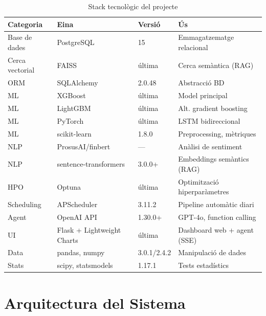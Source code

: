 \documentclass[12pt, a4paper]{report}
\begin{document}
\begin{table}[H]
\centering
\caption{Stack tecnològic del projecte}
\label{tab:stack}
\begin{tabular}{@{}llll@{}}
\toprule
\textbf{Categoria} & \textbf{Eina} & \textbf{Versió} & \textbf{Ús} \\
\midrule
Base de dades    & PostgreSQL             & 15          & Emmagatzematge relacional \\
Cerca vectorial  & FAISS                  & última      & Cerca semàntica (RAG) \\
ORM              & SQLAlchemy             & 2.0.48      & Abstracció BD \\
ML               & XGBoost                & última      & Model principal \\
ML               & LightGBM               & última      & Alt. gradient boosting \\
ML               & PyTorch                & última      & LSTM bidireccional \\
ML               & scikit-learn           & 1.8.0       & Preprocessing, mètriques \\
NLP              & ProsusAI/finbert       & ---         & Anàlisi de sentiment \\
NLP              & sentence-transformers  & 3.0.0+      & Embeddings semàntics (RAG) \\
HPO              & Optuna                 & última      & Optimització hiperparàmetres \\
Scheduling       & APScheduler            & 3.11.2      & Pipeline automàtic diari \\
Agent            & OpenAI API             & 1.30.0+     & GPT-4o, function calling \\
UI               & Flask + Lightweight Charts & última  & Dashboard web + agent (SSE) \\
Data             & pandas, numpy          & 3.0.1/2.4.2 & Manipulació de dades \\
Stats            & scipy, statsmodels     & 1.17.1      & Tests estadístics \\
\bottomrule
\end{tabular}
\end{table}

\chapter{Arquitectura del Sistema}
\end{document}
